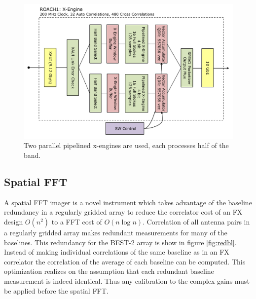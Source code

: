 \documentclass[useAMS,usenatbib,onecolumn]{mn2e}
\begin{document}
\begin{figure}
    \centering
    \includegraphics[scale=0.6]{graphics/crop_xengine_block.pdf}
    \caption{Two parallel pipelined x-engines are used, each processes half of the band.}
    \label{fig:xeng_block}
\end{figure}

\subsection{Spatial FFT}

A spatial FFT imager is a novel instrument which takes advantage of the baseline redundancy in a regularly gridded array to reduce the correlator cost of an FX design $O(n^2)$ to a FFT cost of $O(n \log{n})$.
Correlation of all antenna pairs in a regularly gridded array makes redundant measurements for many of the baselines.
This redundancy for the BEST-2 array is show in figure \ref{fig:redbl}.
Instead of making individual correlations of the same baseline as in an FX correlator the correlation of the average of each baseline can be computed.
This optimization realizes on the assumption that each redundant baseline measurement is indeed identical.
Thus any calibration to the complex gains must be applied before the spatial FFT.
\end{document}
